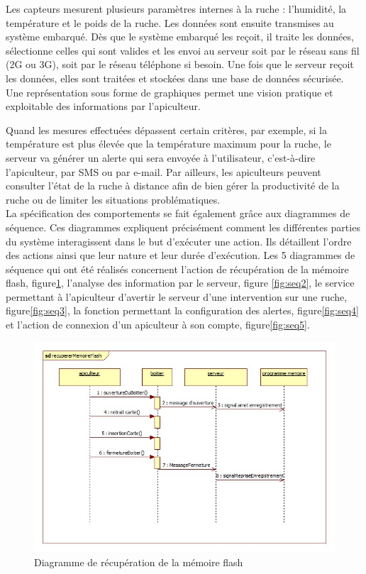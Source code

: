 Les capteurs mesurent plusieurs paramètres internes à la ruche : l'humidité, la température et le poids de la ruche. Les données sont ensuite transmises au système embarqué. Dès que le système embarqué les reçoit, il traite les données, sélectionne celles qui sont valides et les envoi au serveur soit par le réseau sans fil (2G ou 3G), soit par le réseau téléphone si besoin. Une fois que le serveur reçoit les données, elles sont traitées et stockées dans une base de données sécurisée. Une représentation sous forme de graphiques permet une vision pratique et exploitable des informations par l'apiculteur.

Quand les mesures effectuées dépassent certain critères, par exemple, si la température est plus élevée que la température maximum pour la ruche, le serveur va générer un alerte qui sera envoyée à l'utilisateur, c'est-à-dire l'apiculteur, par SMS ou par e-mail. Par ailleurs, les apiculteurs peuvent consulter l’état de la ruche à distance afin de bien gérer la productivité de la ruche ou de limiter les situations problématiques. \\


La spécification des comportements se fait également grâce aux diagrammes de séquence. Ces diagrammes expliquent précisément comment les différentes parties du système interagissent dans le but d'exécuter une action. Ils détaillent l'ordre des actions ainsi que leur nature et leur durée d'exécution. Les 5 diagrammes de séquence qui ont été réalisés concernent l'action de récupération de la mémoire flash, figure\ref{fig:seq1}, l'analyse des information par le serveur, figure \ref{fig:seq2}, le service permettant à l'apiculteur d'avertir le serveur d'une intervention sur une ruche, figure\ref{fig:seq3}, la fonction permettant la configuration des alertes, figure\ref{fig:seq4} et l'action de connexion d'un apiculteur à son compte, figure\ref{fig:seq5}.
\begin{figure}[h!]
\centering\includegraphics[scale=0.7]{recupererMemoireFlash.jpg}
\caption{\label{fig:seq1} Diagramme de récupération de la mémoire flash}
\end{figure}\\

